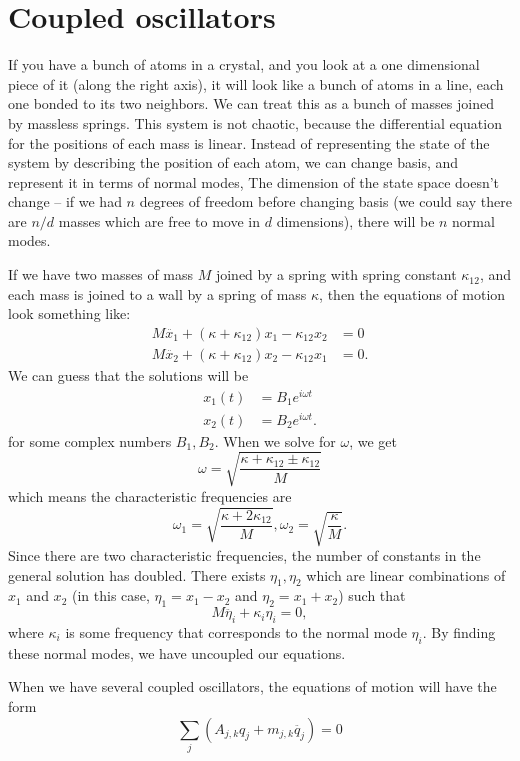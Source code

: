 \documentclass{article}
\begin{document}
\section{Coupled oscillators}
If you have a bunch of atoms in a crystal, and you look at a one dimensional piece of it (along the right axis), it will look like a bunch of atoms in a line, each one bonded to its two neighbors. We can treat this as a bunch of masses joined by massless springs. This system is not chaotic, because the differential equation for the positions of each mass is linear. Instead of representing the state of the system by describing the position of each atom, we can change basis, and represent it in terms of normal modes, The dimension of the state space doesn't change -- if we had $n$ degrees of freedom before changing basis (we could say there are $n/d$ masses which are free to move in $d$ dimensions), there will be $n$ normal modes.
\par
If we have two masses of mass $M$ joined by a spring with spring constant $\kappa_{12}$, and each mass is joined to a wall by a spring of mass $\kappa$, then the equations of motion look something like:
\begin{align*}
    M \ddot{x_1} + (\kappa + \kappa_{12}) x_1 - \kappa_{12}x_2 &= 0 \\
    M \ddot{x_2} + (\kappa + \kappa_{12}) x_2 - \kappa_{12}x_1 &= 0.
\end{align*}
We can guess that the solutions will be
\begin{align*}
    x_1(t) &= B_1 e^{i \omega t} \\
    x_2(t) &= B_2 e^{i \omega t}.
\end{align*}
for some complex numbers $B_1, B_2$. When we solve for $\omega$, we get
\[ \omega = \sqrt{ \frac{\kappa + \kappa_{12} \pm \kappa_{12}}{M}} \]
which means the characteristic frequencies are
\[ \omega_1 = \sqrt{ \frac{\kappa+2\kappa_{12}}{M}}, \omega_2 = \sqrt{ \frac{\kappa}{M}}. \]
Since there are two characteristic frequencies, the number of constants in the general solution has doubled. There exists $\eta_1, \eta_2$ which are linear combinations of $x_1$ and $x_2$ (in this case, $\eta_1=x_1-x_2$ and $\eta_2=x_1+x_2$) such that
\[ M \ddot{\eta_i} + \kappa_i \eta_i = 0, \]
where $\kappa_i$ is some frequency that corresponds to the normal mode $\eta_i$. By finding these normal modes, we have uncoupled our equations.
\par
When we have several coupled oscillators, the equations of motion will have the form
\[ \sum_j \left( A_{j,k} q_j + m_{j,k} \ddot{q_j} \right) =0 \]
\end{document}
